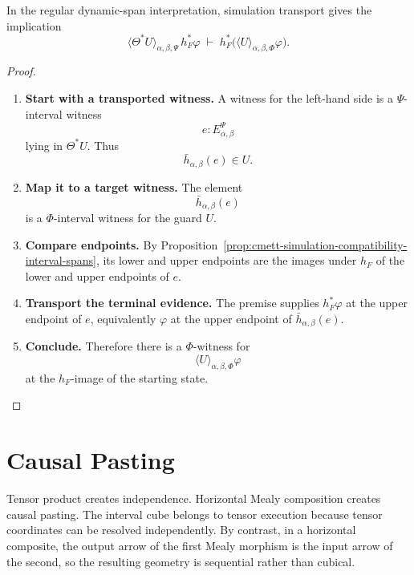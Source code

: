 \begin{proposition}
\label{prop:cmett-simulation-transport-soundness}
    In the regular dynamic-span interpretation, simulation transport gives
    the implication
    \[
        \langle\Theta^*U\rangle_{\alpha,\beta,\Psi}\,h_F^*\varphi
        \;\vdash\;
        h_F^*\bigl(\langle U\rangle_{\alpha,\beta,\Phi}\varphi\bigr).
    \]
\end{proposition}

\begin{proof}
    \leavevmode
    \begin{enumerate}
        \item \textbf{Start with a transported witness.}
        A witness for the left-hand side is a
        \(\Psi\)-interval witness
        \[
            e:E_{\alpha,\beta}^{\Psi}
        \]
        lying in \(\Theta^*U\). Thus
        \[
            \bar h_{\alpha,\beta}(e)\in U.
        \]

        \item \textbf{Map it to a target witness.}
        The element
        \[
            \bar h_{\alpha,\beta}(e)
        \]
        is a \(\Phi\)-interval witness for the guard \(U\).

        \item \textbf{Compare endpoints.}
        By Proposition~\ref{prop:cmett-simulation-compatibility-interval-spans},
        its lower and upper endpoints are the images under \(h_F\) of the
        lower and upper endpoints of \(e\).

        \item \textbf{Transport the terminal evidence.}
        The premise supplies \(h_F^*\varphi\) at the upper endpoint of \(e\),
        equivalently \(\varphi\) at the upper endpoint of
        \(\bar h_{\alpha,\beta}(e)\).

        \item \textbf{Conclude.}
        Therefore there is a \(\Phi\)-witness for
        \[
            \langle U\rangle_{\alpha,\beta,\Phi}\varphi
        \]
        at the \(h_F\)-image of the starting state.
    \end{enumerate}
\end{proof}

\section{Causal Pasting}
\label{sec:cmett-causal-pasting}

Tensor product creates independence. Horizontal Mealy composition creates
causal pasting. The interval cube belongs to tensor execution because tensor
coordinates can be resolved independently. By contrast, in a horizontal
composite, the output arrow of the first Mealy morphism is the input arrow of
the second, so the resulting geometry is sequential rather than cubical.

